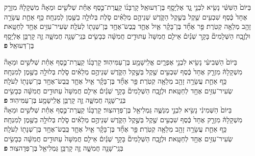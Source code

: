 \documentclass[twoside, openany, parskip=half, 11pt]{book}
\begin{document}
\begin{footnotesize}
\begin{multicols}{2}

בַּיּוֹם֙ הַשִּׁשִּׁ֔י נָשִׂ֖יא לִבְנֵ֣י גָ֑ד אֶלְיָסָ֖ף בֶּן־דְּעוּאֵֽל׃ קָרְבָּנ֜וֹ קַֽעֲרַת־כֶּ֣סֶף אַחַ֗ת שְׁלֹשִׁ֣ים וּמֵאָה֘ מִשְׁקָלָהּ֒ מִזְרָ֤ק אֶחָד֙ כֶּ֔סֶף שִׁבְעִ֥ים שֶׁ֖קֶל בְּשֶׁ֣קֶל הַקֹּ֑דֶשׁ שְׁנֵיהֶ֣ם מְלֵאִ֗ים סֹ֛לֶת בְּלוּלָ֥ה בַשֶּׁ֖מֶן לְמִנְחָֽה׃ כַּ֥ף אַחַ֛ת עֲשָׂרָ֥ה זָהָ֖ב מְלֵאָ֥ה קְטֹֽרֶת׃ פַּ֣ר אֶחָ֞ד בֶּן־בָּקָ֗ר אַ֧יִל אֶחָ֛ד כֶּֽבֶשׂ־אֶחָ֥ד בֶּן־שְׁנָת֖וֹ לְעֹלָֽה׃ שְׂעִיר־עִזִּ֥ים אֶחָ֖ד לְחַטָּֽאת׃ וּלְזֶ֣בַֽח הַשְּׁלָמִים֘ בָּקָ֣ר שְׁנַ֒יִם֒ אֵילִ֤ם חֲמִשָּׁה֙ עַתּוּדִ֣ים חֲמִשָּׁ֔ה כְּבָשִׂ֥ים בְּנֵֽי־שָׁנָ֖ה חֲמִשָּׁ֑ה זֶ֛ה קָרְבַּ֥ן אֶלְיָסָ֖ף בֶּן־דְּעוּאֵֽל׃ \textbf{פ} 
 

בַּיּוֹם֙ הַשְּׁבִיעִ֔י נָשִׂ֖יא לִבְנֵ֣י אֶפְרָ֑יִם אֱלִֽישָׁמָ֖ע בֶּן־עַמִּיהֽוּד׃ קָרְבָּנ֜וֹ קַֽעֲרַת־כֶּ֣סֶף אַחַ֗ת שְׁלֹשִׁ֣ים וּמֵאָה֘ מִשְׁקָלָהּ֒ מִזְרָ֤ק אֶחָד֙ כֶּ֔סֶף שִׁבְעִ֥ים שֶׁ֖קֶל בְּשֶׁ֣קֶל הַקֹּ֑דֶשׁ שְׁנֵיהֶ֣ם מְלֵאִ֗ים סֹ֛לֶת בְּלוּלָ֥ה בַשֶּׁ֖מֶן לְמִנְחָֽה׃ כַּ֥ף אַחַ֛ת עֲשָׂרָ֥ה זָהָ֖ב מְלֵאָ֥ה קְטֹֽרֶת׃   פַּ֣ר אֶחָ֞ד בֶּן־בָּקָ֗ר אַ֧יִל אֶחָ֛ד כֶּֽבֶשׂ־אֶחָ֥ד בֶּן־שְׁנָת֖וֹ לְעֹלָֽה׃ שְׂעִיר־עִזִּ֥ים אֶחָ֖ד לְחַטָּֽאת׃ וּלְזֶ֣בַֽח הַשְּׁלָמִים֘ בָּקָ֣ר שְׁנַ֒יִם֒ אֵילִ֤ם חֲמִשָּׁה֙ עַתּוּדִ֣ים חֲמִשָּׁ֔ה כְּבָשִׂ֥ים בְּנֵֽי־שָׁנָ֖ה חֲמִשָּׁ֑ה זֶ֛ה קָרְבַּ֥ן אֱלִֽישָׁמָ֖ע בֶּן־עַמִּיהֽוּד׃ \textbf{פ}
 \\
  בַּיּוֹם֙ הַשְּׁמִינִ֔י נָשִׂ֖יא לִבְנֵ֣י מְנַשֶּׁ֑ה גַּמְלִיאֵ֖ל בֶּן־פְּדָהצֽוּר׃ קָרְבָּנ֜וֹ קַֽעֲרַת־כֶּ֣סֶף אַחַ֗ת שְׁלֹשִׁ֣ים וּמֵאָה֘ מִשְׁקָלָהּ֒ מִזְרָ֤ק אֶחָד֙ כֶּ֔סֶף שִׁבְעִ֥ים שֶׁ֖קֶל בְּשֶׁ֣קֶל הַקֹּ֑דֶשׁ שְׁנֵיהֶ֣ם מְלֵאִ֗ים סֹ֛לֶת בְּלוּלָ֥ה בַשֶּׁ֖מֶן לְמִנְחָֽה׃ כַּ֥ף אַחַ֛ת עֲשָׂרָ֥ה זָהָ֖ב מְלֵאָ֥ה קְטֹֽרֶת׃ פַּ֣ר אֶחָ֞ד בֶּן־בָּקָ֗ר אַ֧יִל אֶחָ֛ד כֶּֽבֶשׂ־אֶחָ֥ד בֶּן־שְׁנָת֖וֹ לְעֹלָֽה׃ שְׂעִיר־עִזִּ֥ים אֶחָ֖ד לְחַטָּֽאת׃ וּלְזֶ֣בַֽח הַשְּׁלָמִים֘ בָּקָ֣ר שְׁנַ֒יִם֒ אֵילִ֤ם חֲמִשָּׁה֙ עַתּוּדִ֣ים חֲמִשָּׁ֔ה כְּבָשִׂ֥ים בְּנֵֽי־שָׁנָ֖ה חֲמִשָּׁ֑ה זֶ֛ה קָרְבַּ֥ן גַּמְלִיאֵ֖ל בֶּן־פְּדָהצֽוּר׃ \textbf{פ} 



\end{multicols}
\end{footnotesize}
\end{document}
